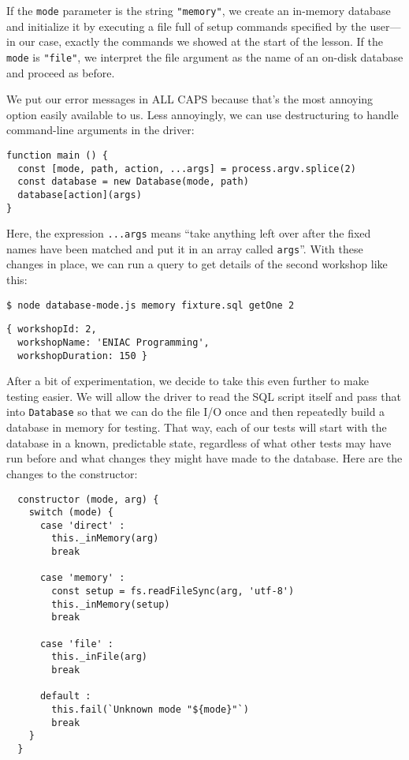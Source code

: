If the \texttt{mode} parameter is the string \texttt{"memory"},
we create an in-memory database and initialize it by executing
a file full of setup commands specified by the user---in our case,
exactly the commands we showed at the start of the lesson.
If the \texttt{mode} is \texttt{"file"},
we interpret the file argument as the name of an on-disk database
and proceed as before.

We put our error messages in ALL CAPS because that's the most annoying option easily available to us.
Less annoyingly,
we can use destructuring to handle command-line arguments in the driver:

\begin{verbatim}
function main () {
  const [mode, path, action, ...args] = process.argv.splice(2)
  const database = new Database(mode, path)
  database[action](args)
}
\end{verbatim}

Here, the expression \texttt{...args} means
``take anything left over after the fixed names have been matched and put it in an array called \texttt{args}''.
With these changes in place,
we can run a query to get details of the second workshop like this:

\begin{verbatim}
$ node database-mode.js memory fixture.sql getOne 2
\end{verbatim}

\begin{verbatim}
{ workshopId: 2,
  workshopName: 'ENIAC Programming',
  workshopDuration: 150 }
\end{verbatim}

After a bit of experimentation,
we decide to take this even further to make testing easier.
We will allow the driver to read the SQL script itself and pass that into \texttt{Database}
so that we can do the file I/O once and then repeatedly build a database in memory for testing.
That way,
each of our tests will start with the database in a known, predictable state,
regardless of what other tests may have run before
and what changes they might have made to the database.
Here are the changes to the constructor:

\begin{verbatim}
  constructor (mode, arg) {
    switch (mode) {
      case 'direct' :
        this._inMemory(arg)
        break

      case 'memory' :
        const setup = fs.readFileSync(arg, 'utf-8')
        this._inMemory(setup)
        break

      case 'file' :
        this._inFile(arg)
        break

      default :
        this.fail(`Unknown mode "${mode}"`)
        break
    }
  }
\end{verbatim}

